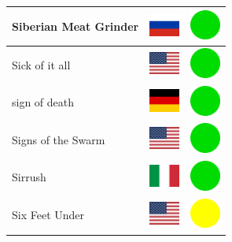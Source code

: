 \documentclass[12pt, a4paper, twoside]{report}
\begin{document}
\begin{center}
\begin{longtable}{|p{5cm}|p{2cm}|p{2cm}|}
 Siberian Meat Grinder                                      & \includegraphics[width=1cm]{../4x3/ru} &   \includegraphics[width=1cm]{../likes/y} \\ \hline
 Sick of it all                                             & \includegraphics[width=1cm]{../4x3/us} &   \includegraphics[width=1cm]{../likes/y} \\ \hline
 sign of death                                              & \includegraphics[width=1cm]{../4x3/de} &   \includegraphics[width=1cm]{../likes/y} \\ \hline
 Signs of the Swarm                                         & \includegraphics[width=1cm]{../4x3/us} &   \includegraphics[width=1cm]{../likes/y} \\ \hline
 Sirrush                                                    & \includegraphics[width=1cm]{../4x3/it} &   \includegraphics[width=1cm]{../likes/y} \\ \hline
 Six Feet Under                                             & \includegraphics[width=1cm]{../4x3/us} &   \includegraphics[width=1cm]{../likes/m} \\ \hline

\end{longtable}
\end{center}
\end{document}

